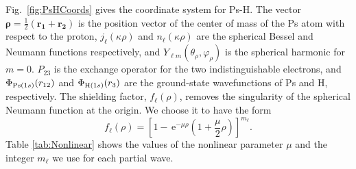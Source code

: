 \documentclass[preprint,showpacs,showkeys,preprintnumbers,amsmath,amssymb,longbibliography,pra,aps]{revtex4-1}
\newcommand{\ee} {\,\text{e}}
\begin{document}
Fig.~\ref{fig:PsHCoords} gives the
coordinate system for Ps-H. The vector
$\bm{\rho} = \frac{1}{2}\left(\bm{r_1} + \bm{r_2}\right)$ is the position
vector of the center of mass of the Ps atom with respect to the proton,
$j_\ell\left(\kappa\rho\right)$ and $n_\ell\left(\kappa\rho\right)$ are
the spherical Bessel and Neumann functions respectively, and
$Y_{\ell m}(\theta_\rho, \varphi_\rho)$ is the spherical harmonic for $m = 0$.
$P_{23}$ is the exchange operator for the two indistinguishable electrons, and
$\Phi_{{\rm{Ps}}(1s)}\!\left(r_{12}\right)$ and
$\Phi_{{\rm{H}}(1s)}\!\left(r_3\right)$ are the ground-state wavefunctions
of Ps and H, respectively. The shielding factor, $f_\ell(\rho)$,
removes the singularity of the spherical Neumann function
at the origin. We choose it to have the form
\begin{equation}
f_\ell(\rho) = \left[1 - \ee^{-\mu \rho} \left(1+\frac{\mu}{2}\rho\right)
\right]^{m_\ell}.
\label{eq:PartialWaveShielding}
\end{equation}
Table \ref{tab:Nonlinear} shows the values of the
nonlinear parameter $\mu$ and the integer $m_\ell$ we use for each partial
wave.
\end{document}

